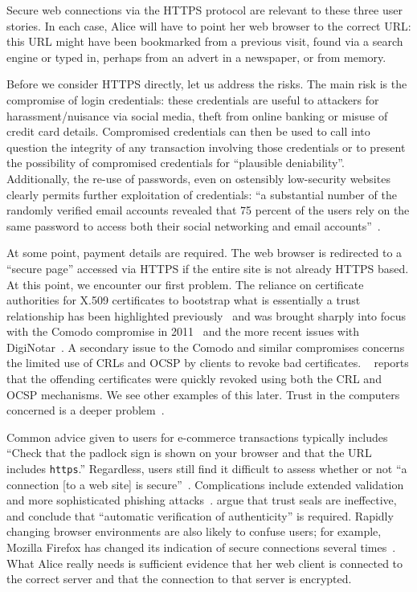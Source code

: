 \documentclass{article}
\def\citeN{\citet}
\def\cite{\citep}
\begin{document}
Secure web connections via the HTTPS protocol are relevant to these
three user stories.  In each case, Alice will have to point
her web browser to the correct URL: this URL might have been
bookmarked from a previous visit, found via a search engine or typed
in, perhaps from an advert in a newspaper, or from memory.

Before we consider HTTPS directly, let us address the risks.
The main risk is the compromise of login credentials: these
credentials are useful to attackers for harassment/nuisance via
social media, theft from online banking or misuse of credit card
details. Compromised credentials can then be used to call into
question the integrity of any transaction involving those credentials
or to present the possibility of compromised credentials for
``plausible deniability''.  Additionally, the re-use of passwords,
even on ostensibly low-security websites clearly permits further
exploitation of credentials: ``a substantial number of the randomly verified email accounts revealed that 75 percent of the users rely on the same password to access both their social networking and email accounts''~\cite{mBitDefender1}.

At some point, payment details are required.  The web browser is
redirected to a ``secure page'' accessed via HTTPS if the entire site
is not already HTTPS based.  At this point, we encounter our first
problem.  The reliance on certificate authorities for X.509
certificates to bootstrap what is essentially a trust relationship has
been highlighted previously~\cite{Perlman99} and was brought sharply
into focus with the Comodo compromise in 2011~\cite{mComodo1} and the more recent issues with DigiNotar~\cite{mLWN1}.  A
secondary issue to the Comodo and similar compromises concerns the limited use of
CRLs and OCSP by clients to revoke bad certificates.
\citeN{mMozilla}~ reports that the offending certificates were quickly
revoked using both the CRL and OCSP mechanisms.  We see other examples
of this later.  Trust in the computers concerned is a deeper
problem~\cite{Parno+10}.

Common advice given to users for e-commerce transactions typically
includes “Check that the padlock sign is shown on your browser and
that the URL includes \verb|https|.”  Regardless, users still find it difficult to assess whether or not “a connection [to a web site] is secure”~\cite{Friedman+02}. Complications include extended
validation and more sophisticated phishing attacks~\cite{Jackson+07}.  \citeN{Kirlappos+12} argue that trust seals are ineffective, and conclude that “automatic verification of authenticity” is required.
Rapidly changing browser environments are also likely to confuse users; for example, Mozilla Firefox has changed its indication of secure connections several times~\cite{mSchultze1}.
What Alice really needs is sufficient evidence that her web client
is connected to the correct server and that the connection to that
server is encrypted.
\end{document}
